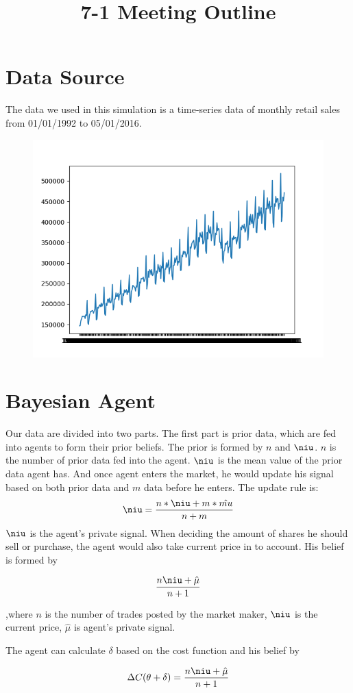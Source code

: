 \documentclass[11pt]{article}
\begin{document}
\title{7-1 Meeting Outline}
\maketitle
\section{Data Source}
The data we used in this simulation is a time-series data of monthly retail sales from 01/01/1992 to 05/01/2016.
\begin{figure}[H]
\centering
\includegraphics[scale=1]{./data_diagram.png}
\end{figure}

\section{Bayesian Agent}
Our data are divided into two parts. The first part is prior data, which are fed into agents to form their prior beliefs. The prior is formed by $n$ and $\niu$. $n$ is the number of prior data fed into the agent. $\niu$ is the mean value of the prior data agent has. And once agent enters the market, he would update his signal based on both prior data and $m$ data before he enters. The update rule is:
$$
\niu=\frac{n*\niu+m*\hat{mu}}{n+m}
$$
$\niu$ is the agent's private signal. When deciding the amount of shares he should sell or purchase, the agent would also take current price in to account. His belief is formed by

$$
\frac{n\niu+\hat{\mu}}{n+1}
$$

,where $n$ is the number of trades posted by the market maker, $\niu$ is the current price, $\hat{\mu}$ is agent's private signal.

The agent can calculate $\delta$ based on the cost function and his belief by 

$$
\Delta C(\theta+\delta)=\frac{n\niu+\hat{\mu}}{n+1}
$$
\end{document}
